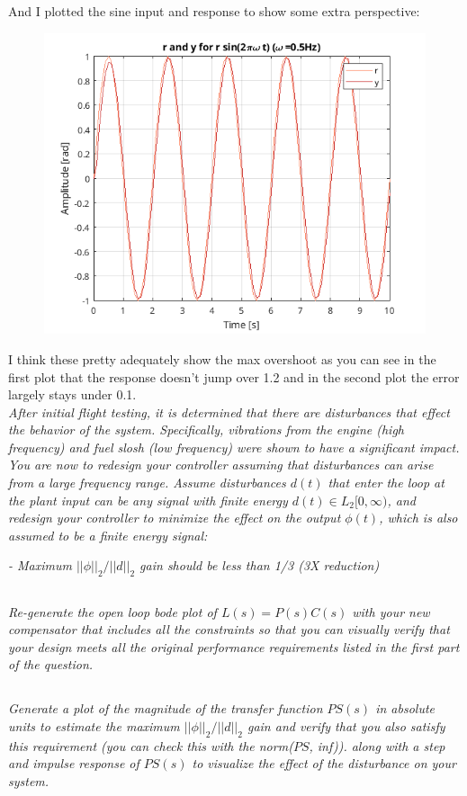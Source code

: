 \documentclass{article}
\begin{document}
And I plotted the sine input and response to show some extra perspective:

\begin{figure}[H]
    \centering
    \includegraphics[width=\textwidth]{d4clRY.png}
\end{figure}

I think these pretty adequately show the max overshoot as you can see in the first plot that the response doesn't jump over 1.2 and in the second plot the error largely stays under 0.1. \\

\textit{After initial flight testing, it is determined that there are disturbances that effect the behavior of the system. Specifically, vibrations from the engine (high frequency) and fuel slosh (low frequency) were shown to have a significant impact. You are now to redesign your controller assuming that disturbances can arise from a large frequency range. Assume disturbances $d(t)$ that enter the loop at the plant input can be any signal with finite energy $d(t) \in L_2[0, \infty)$, and redesign your controller to minimize the effect on the output $\phi(t)$, which is also assumed to be a finite energy signal:}
    
\textit{- Maximum $||\phi||_2/||d||_2$ gain should be less than 1/3 (3X reduction)}

\subsection{}
\textit{Re-generate the open loop bode plot of $L(s) = P(s)C(s)$ with your new compensator that includes all the constraints so that you can visually verify that your design meets all the original performance requirements listed in the first part of the question.}

\subsection{}
\textit{Generate a plot of the magnitude of the transfer function $PS(s)$ in absolute units to estimate the maximum $||\phi||_2/||d||_2$ gain and verify that you also satisfy this requirement (you can check this with the norm($PS$, inf)). along with a step and impulse response of $PS(s)$ to visualize the effect of the disturbance on your system.}
\end{document}
